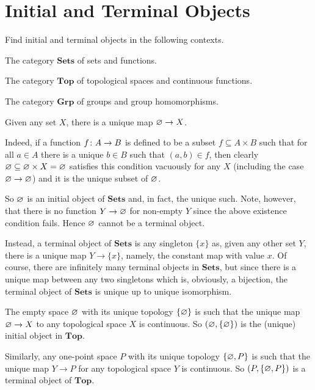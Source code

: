 \bs
\ben[label=(\alph*)]
\item
\item
\item
\een
\es


\section{Initial and Terminal Objects}

\bx
Find initial and terminal objects in the following contexts.
\ben[label=(\alph*)]
\item The category $\mathbf{Sets}$ of sets and functions.
\item The category $\mathbf{Top}$ of topological spaces and continuous functions.
\item The category $\mathbf{Grp}$ of groups and group homomorphisms.
\een
\ex

\bs
\ben[label=(\alph*)]
\item Given any set $X$, there is a unique map $\varnothing \to X$. 

Indeed, if a function $f\colon A\to B$ is defined to be a subset $f\subseteq A\times B$ such that for all $a\in A$ there is a unique $b\in B$ such that $(a,b)\in f$, then clearly $\varnothing \subseteq \varnothing \times X=\varnothing$ satisfies this condition vacuously for any $X$ (including the case $\varnothing\to\varnothing$) and it is the unique subset of $\varnothing$.

So $\varnothing$ is an initial object of $\mathbf{Sets}$ and, in fact, the unique such.
Note, however, that there is no function $Y\to \varnothing$ for non-empty $Y$ since the above existence condition fails. Hence $\varnothing$ cannot be a terminal object.

Instead, a terminal object of $\mathbf{Sets}$ is any singleton $\{x\}$ as, given any other set $Y$, there is a unique map $Y\to \{x\}$, namely, the constant map with value $x$. Of course, there are infinitely many terminal objects in $\mathbf{Sets}$, but since there is a unique map between any two singletons which is, obviously, a bijection, the terminal object of $\mathbf{Sets}$ is unique up to unique isomorphism.
\item The empty space $\varnothing$ with its unique topology $\{\varnothing\}$ is such that the unique map $\varnothing\to X$ to any topological space $X$ is continuous. So $(\varnothing,\{\varnothing\})$ is the (unique) initial object in $\mathbf{Top}$.

Similarly, any one-point space $P$ with its unique topology $\{\varnothing,P\}$ is such that the unique map $Y\to P$ for any topological space $Y$ is continuous. So $(P,\{\varnothing,P\})$ is a terminal object of $\mathbf{Top}$.

